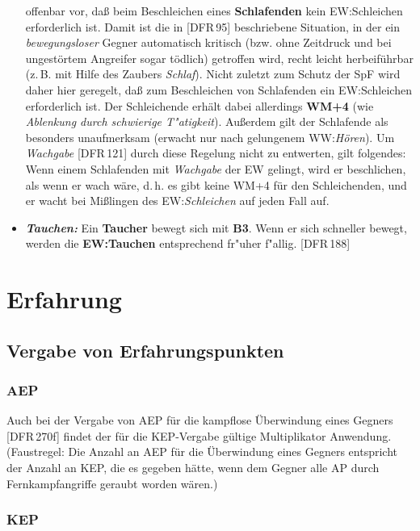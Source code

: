 \documentclass[10pt,a4paper,germanpar]{article}
\begin{document}
\begin{itemize}
  offenbar vor, daß beim Beschleichen eines \textbf{Schlafenden} kein
  EW:Schleichen erforderlich ist. Damit ist die in [DFR\,95]
  beschriebene Situation, in der ein \emph{bewegungsloser} Gegner
  automatisch kritisch (bzw. ohne Zeitdruck und bei ungestörtem
  Angreifer sogar tödlich) getroffen wird, recht leicht herbeiführbar
  (z.\,B. mit Hilfe des Zaubers \emph{Schlaf}). Nicht zuletzt zum
  Schutz der SpF wird daher hier geregelt, daß zum Beschleichen von
  Schlafenden ein EW:Schleichen erforderlich ist. Der Schleichende
  erhält dabei allerdings \textbf{WM+4} (wie \emph{Ablenkung durch
    schwierige T"atigkeit}). Außerdem gilt der Schlafende als
  besonders unaufmerksam (erwacht nur nach gelungenem
  WW:\emph{Hören}). Um \emph{Wachgabe} [DFR\,121] durch diese Regelung
  nicht zu entwerten, gilt folgendes: Wenn einem Schlafenden mit
  \emph{Wachgabe} der EW gelingt, wird er beschlichen, als wenn er
  wach wäre, d.\,h. es gibt keine WM+4 für den Schleichenden, und er
  wacht bei Mißlingen des EW:\emph{Schleichen} auf jeden Fall auf.
\item \emph{\textbf{Tauchen: }}Ein \textbf{Taucher} bewegt sich mit
  \textbf{B3}. Wenn er sich schneller bewegt, werden die
  \textbf{EW:Tauchen} entsprechend fr"uher f"allig. [DFR\,188]
\end{itemize} 

\section{Erfahrung}

\subsection{Vergabe von Erfahrungspunkten}

\subsubsection{AEP}
\label{aep}

Auch bei der Vergabe von AEP für die kampflose Überwindung eines
Gegners [DFR\,270f] findet der für die KEP-Vergabe gültige
Multiplikator Anwendung. (Faustregel: Die Anzahl an AEP für die
Überwindung eines Gegners entspricht der Anzahl an KEP, die es gegeben
hätte, wenn dem Gegner alle AP durch Fernkampfangriffe geraubt worden
wären.)

\subsubsection{KEP}
\end{document}
